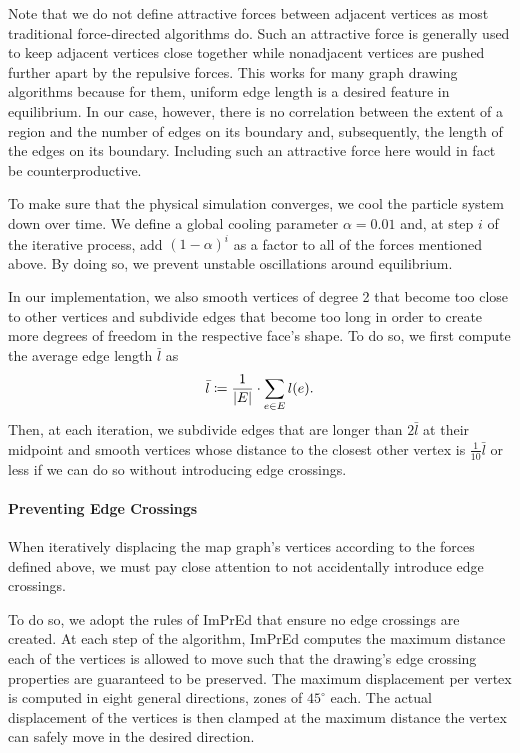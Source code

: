 Note that we do not define attractive forces between adjacent vertices as most traditional force-directed algorithms do.
Such an attractive force is generally used to keep adjacent vertices close together while nonadjacent vertices are pushed further apart by the repulsive forces.
This works for many graph drawing algorithms because for them, uniform edge length is a desired feature in equilibrium.
In our case, however, there is no correlation between the extent of a region and the number of edges on its boundary and, subsequently, the length of the edges on its boundary.
Including such an attractive force here would in fact be counterproductive.

To make sure that the physical simulation converges, we cool the particle system down over time.
We define a global cooling parameter $\alpha = 0.01$ and, at step $i$ of the iterative process, add $(1 - \alpha)^i$ as a factor to all of the forces mentioned above.
By doing so, we prevent unstable oscillations around equilibrium.

In our implementation, we also smooth vertices of degree 2 that become too close to other vertices and subdivide edges that become too long in order to create more degrees of freedom in the respective face's shape.
To do so, we first compute the average edge length $\bar{l}$ as
%
\begin{equation*}
	\bar{l} \coloneqq \frac1{\left\lvert E\right\rvert} \cdot \sum\limits_{e \in E} l(e)
	.
\end{equation*}
%
Then, at each iteration, we subdivide edges that are longer than $2\bar{l}$ at their midpoint and smooth vertices whose distance to the closest other vertex is $\frac{1}{10}\bar{l}$ or less if we can do so without introducing edge crossings.



\paragraph{Preventing Edge Crossings}

When iteratively displacing the map graph's vertices according to the forces defined above, we must pay close attention to not accidentally introduce edge crossings.

To do so, we adopt the rules of ImPrEd \cite{simonetto2011impred} that ensure no edge crossings are created.
At each step of the algorithm, ImPrEd computes the maximum distance each of the vertices is allowed to move such that the drawing's edge crossing properties are guaranteed to be preserved.
The maximum displacement per vertex is computed in eight general directions, zones of $45^\circ$ each.
The actual displacement of the vertices is then clamped at the maximum distance the vertex can safely move in the desired direction.
